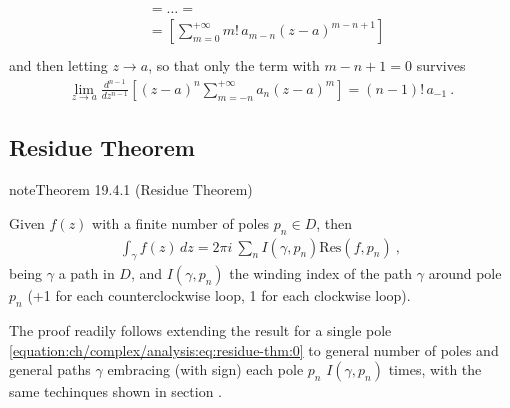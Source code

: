 \documentclass[letterpaper,10pt,english]{jupyterBook}
\begin{document}
\begin{itemize}
\begin{equation*}
\begin{split}
\begin{aligned}
    & = \dots = \\
    & = \left[ \sum_{m=0}^{+\infty} m! \, a_{m-n} (z-a)^{m-n+1} \right] \\
  \end{aligned}\end{split}
\end{equation*}
\sphinxAtStartPar
and then letting \(z \rightarrow a\), so that only the term with \(m-n+1 = 0\) survives
\begin{equation*}
\begin{split}\lim_{z \rightarrow a} \frac{d^{n-1}}{dz^{n-1}} \left[ (z-a)^n \sum_{m=-n}^{+\infty} a_n (z-a)^m \right] = (n-1)! \, a_{-1} \ .\end{split}
\end{equation*}
\end{itemize}


\subsection{Residue Theorem}
\label{\detokenize{ch/complex/analysis:residue-theorem}}\label{\detokenize{ch/complex/analysis:complex-analysis-mero-fun-residues-thm}}\label{ch/complex/analysis:theorem-6}
\begin{sphinxadmonition}{note}{Theorem 19.4.1 (Residue Theorem)}



\sphinxAtStartPar
Given \(f(z)\) with a finite number of poles \(p_n \in D\), then
\begin{equation*}
\begin{split}\int_{\gamma} f(z) \, dz = 2 \pi i \ \sum_{n} I(\gamma, p_n) \text{Res}(f,p_n) \ ,\end{split}
\end{equation*}
\sphinxAtStartPar
being \(\gamma\) a path in \(D\), and \(I(\gamma, p_n)\) the winding index of the path \(\gamma\) around pole \(p_n\) (+1 for each counter\sphinxhyphen{}clockwise loop, \sphinxhyphen{}1 for each clockwise loop).
\end{sphinxadmonition}

\sphinxAtStartPar
The proof readily follows extending the result for a single pole \eqref{equation:ch/complex/analysis:eq:residue-thm:0} to general number of poles and general paths \(\gamma\) embracing (with sign) each pole \(p_n\) \(I(\gamma,p_n)\) times, with the same techinques shown in section {\hyperref[\detokenize{ch/complex/analysis:complex-analysis-useful-int-path-independence-sum}]{}}.
\end{document}
